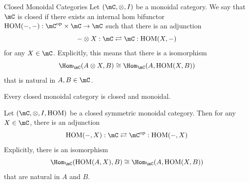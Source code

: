 \documentclass[a4paper]{article}
\begin{document}
\begin{defn}{Closed Monoidal Categories}{} Let $(\mC,\otimes,I)$ be a monoidal category. We say that $\mC$ is closed if there exists an internal hom bifunctor $\text{HOM}(-,-):\mC^\text{op}\times\mC\to\mC$ such that there is an adjunction $$-\otimes X:\mC\rightleftarrows\mC:\text{HOM}(X,-)$$ for any $X\in\mC$. Explicitly, this means that there is a isomorphism $$\Hom_\mC(A\otimes X,B)\cong\Hom_\mC(A,\text{HOM}(X,B))$$ that is natural in $A,B\in\mC$. 
\end{defn}

\begin{prp}{}{} Every closed monoidal category is closed and monoidal. 
\end{prp}

\begin{prp}{}{} Let $(\mC,\otimes,I,\text{HOM})$ be a closed symmetric monoidal category. Then for any $X\in\mC$, there is an adjunction $$\text{HOM}(-,X):\mC\rightleftarrows\mC^\text{op}:\text{HOM}(-,X)$$ Explicitly, there is an isomorphism $$\Hom_\mC(\text{HOM}(A,X),B)\cong\Hom_\mC(A,\text{HOM}(X,B))$$ that are natural in $A$ and $B$. 
\end{prp}
\end{document}
